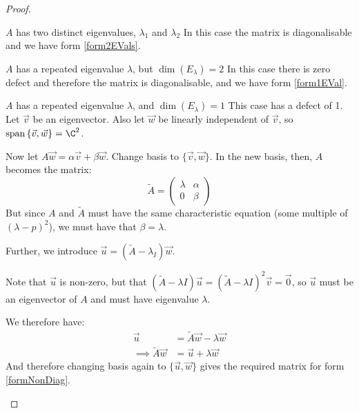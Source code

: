 \documentclass[../Main.tex]{subfiles}
\begin{document}
\begin{proof}
    \begin{case}{$A$ has two distinct eigenvalues, $\lambda_1$ and $\lambda_2$}
        In this case the matrix is diagonalisable and we have form \ref{form2EVals}.
    \end{case}
    \begin{case}{$A$ has a repeated eigenvalue $\lambda$, but $\dim{(E_\lambda)} = 2$}
        In this case there is zero defect and therefore the matrix is diagonalisable, and we have form \ref{form1EVal}.
    \end{case}
    \begin{case}{$A$ has a repeated eigenvalue $\lambda$, and $\dim{(E_\lambda)} = 1$}
        This case has a defect of 1. Let $\vec{v}$ be an eigenvector. Also let $\vec{w}$ be linearly independent of $\vec{v}$, so $\spanset{\{\vec{v}, \vec{w}\}} = \C^2$.\par
        Now let $A\vec{w} = \alpha \vec{v} + \beta \vec{w}$. Change basis to $\{\vec{v}, \vec{w}\}$. In the new basis, then, $A$ becomes the matrix:
        \begin{equation*}
            \tilde{A} =
            \begin{pmatrix}
                \lambda & \alpha \\
                0 & \beta
            \end{pmatrix}
        \end{equation*}
        But since $A$ and $\tilde{A}$ must have the same characteristic equation (some multiple of $(\lambda - p)^2$), we must have that $\beta = \lambda$.\par
        Further, we introduce $\vec{u} = (\tilde{A} - \lambda_I) \vec{w}$.\par
        Note that $\vec{u}$ is non-zero, but that $(\tilde{A} - \lambda I) \vec{u} = (\tilde{A} - \lambda I)^2 \vec{v} = \vec{0}$, so $\vec{u}$ must be an eigenvector of $A$ and must have eigenvalue $\lambda$.\par
        We therefore have:
        \begin{align*}
            \vec{u} &= \tilde{A} \vec{w} - \lambda \vec{w} \\
            \implies \tilde{A} \vec{w} &= \vec{u} + \lambda \vec{w}
        \end{align*}
        And therefore changing basis again to $\{\vec{u}, \vec{w}\}$ gives the required matrix for form \ref{formNonDiag}.
    \end{case}
\end{proof}
\end{document}
